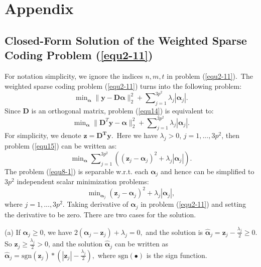%
\chapter{Appendix}
\label{sec:appendix}

\section{Closed-Form Solution of the Weighted Sparse Coding Problem (\ref{equ2-11})}

For notation simplicity, we ignore the indices $n,m,t$ in problem (\ref{equ2-11}).\ The weighted sparse coding problem (\ref{equ2-11}) turns into the following problem:
\begin{equation}
\label{equ8-1}
\min\nolimits_{\bm{\alpha}}\|\bm{y}-\bm{D}\bm{\alpha}\|_{2}^{2}+\sum\nolimits_{j=1}^{3p^2}\lambda_{j}|\bm{\alpha}_{j}|.
\end{equation}
Since $\bm{D}$ is an orthogonal matrix, problem (\ref{equ14}) is equivalent to:
\begin{equation}
\label{equ8-2}
\min\nolimits_{\bm{\alpha}}\|\bm{D}^{T}\bm{y}-\bm{\alpha}\|_{2}^{2}+\sum\nolimits_{j=1}^{3p^2}\lambda_{j}|\bm{\alpha}_{j}|.
\end{equation}
For simplicity, we denote $\bm{z} = \bm{D^{T}y}$.\ Here we have $\lambda_{j}>0$, $j=1,...,3p^2$, then problem (\ref{equ15}) can be written as:
\begin{equation}
\label{equ8-3}
\min\nolimits_{\boldsymbol{\alpha}}\sum\nolimits_{j=1}^{3p^2}((\bm{z}_{j}-\bm{\alpha}_{j})^{2}+\lambda_{j}|\bm{\alpha}_{j}|).
\end{equation}
The problem (\ref{equ8-1}) is separable w.r.t. each $\bm{\alpha}_{j}$ and hence can be simplified to $3p^2$ independent scalar minimization problems:
\begin{equation}
\label{equ8-4}
\min\nolimits_{\bm{\alpha}_{j}}(\bm{z}_{j}-\bm{\alpha}_{j})^{2}+\lambda_{j}|\bm{\alpha}_{j}|,
\end{equation}
where $j=1,...,3p^2$. Taking derivative of $\bm{\alpha}_{j}$ in problem (\ref{equ2-11}) and setting the derivative to be zero. There are two cases for the solution.

(a) If $\bm{\alpha}_{j}\ge 0$, we have 
$
2(\bm{\alpha}_{j}-\bm{z}_{j})+\lambda_{j}=0,
$ and the solution is
$
\hat{\bm{\alpha}}_{j}=\bm{z}_{j}-\frac{\lambda_{j}}{2} \ge 0.
$
So $\bm{z}_{j}\ge\frac{\lambda_{j}}{2}> 0$, and the solution $\hat{\bm{\alpha}}_{j}$ can be written as
$
\hat{\bm{\alpha}}_{j}=\text{sgn}(\bm{z}_{j})*(|\bm{z}_{j}|-\frac{\lambda_{j}}{2}),
$
where $\text{sgn}(\bullet)$ is the sign function. 

